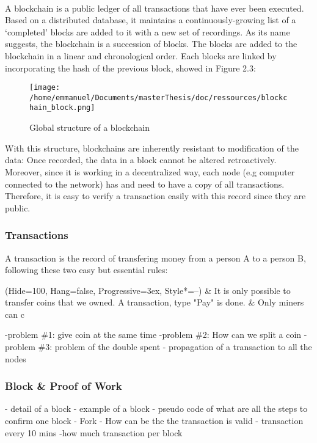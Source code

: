\paragraph{}
A blockchain is a public ledger of all transactions that have ever been executed. Based on a distributed database, it maintains a continuously-growing list of a ‘completed’ blocks are added to it with a new set of recordings. As its name suggests, the blockchain is a succession of blocks. The blocks are added to the blockchain in a linear and chronological order. Each blocks are linked by incorporating the hash of the previous block, showed in Figure 2.3:
\begin{figure}[htp]
\centering
\texttt{[image: /home/emmanuel/Documents/masterThesis/doc/ressources/blockchain\_block.png]}
\caption{Global structure of a blockchain}
\label{}
\end{figure}
\newline
With this structure, blockchains are inherently resistant to modification of the data: Once recorded, the data in a block cannot be altered retroactively. Moreover, since it is working in a decentralized way, each node (e.g computer connected to the network) has and need to have a copy of all transactions. Therefore, it is easy to verify a transaction easily with this record since they are public.

\subsubsection{Transactions}
A transaction is the record of transfering money from a person A to a person B, following these two easy but essential rules: 
\begin{easylist}[enumerate]
\ListProperties(Hide=100, Hang=false, Progressive=3ex, Style*=--)
& It is only possible to transfer coins that we owned. A transaction, type "Pay" is done. 
& Only miners can c 
\end{easylist}
-problem \#1: give coin at the same time 
\newline
-problem \#2: How can we split a coin 
\newline
-problem \#3: problem of the double spent 
- propagation of a transaction to all the nodes
\newline
\subsubsection{Block \& Proof of Work}
- detail of a block
\newline
- example of a block
\newline
- pseudo code of what are all the steps to confirm one block
\newline
- Fork
\newline
- How can be the the transaction is valid
\newline
- transaction every 10 mins
\newline
-how much transaction per block
